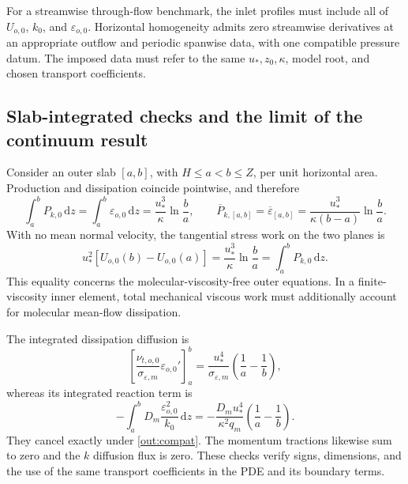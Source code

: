 \documentclass[11pt,a4paper]{article}
\numberwithin{equation}{section}
\newcommand{\eps}{\varepsilon}
\newcommand{\ust}{u_*}
\newcommand{\dd}{\mathrm d}
\begin{document}
For a streamwise through-flow benchmark, the inlet profiles must include
all of $U_{o,0}$, $k_0$, and $\eps_{o,0}$. Horizontal homogeneity admits
zero streamwise derivatives at an appropriate outflow and periodic
spanwise data, with one compatible pressure datum. The imposed data
must refer to the same $\ust,z_0,\kappa$, model root, and chosen
transport coefficients.

\subsection{Slab-integrated checks and the limit of the continuum result}
\label{out:integrals}

Consider an outer slab $[a,b]$, with $H\le a<b\le Z$, per unit
horizontal area. Production and dissipation coincide pointwise, and
therefore
\begin{equation}
 \int_a^b P_{k,0}\,\dd z
 =\int_a^b\eps_{o,0}\,\dd z
 =\frac{\ust^3}{\kappa}\ln\frac ba,
 \qquad
 \overline{P}_{k,[a,b]}=\overline\eps_{[a,b]}
 =\frac{\ust^3}{\kappa(b-a)}\ln\frac ba.
 \label{out:productionintegral}
\end{equation}
With no mean normal velocity, the tangential stress work on the two
planes is
\begin{equation}
 \ust^2[U_{o,0}(b)-U_{o,0}(a)]
 =\frac{\ust^3}{\kappa}\ln\frac ba
 =\int_a^bP_{k,0}\,\dd z.
 \label{out:outerpower}
\end{equation}
This equality concerns the molecular-viscosity-free outer equations.
In a finite-viscosity inner element, total mechanical viscous work
must additionally account for molecular mean-flow dissipation.

The integrated dissipation diffusion is
\begin{equation}
 \left[\frac{\nu_{t,o,0}}{\sigma_{\eps,m}}
           \eps_{o,0}'\right]_a^b
 =\frac{\ust^4}{\sigma_{\eps,m}}
       \left(\frac1a-\frac1b\right),
 \label{out:epsdiffintegral}
\end{equation}
whereas its integrated reaction term is
\begin{equation}
 -\int_a^bD_m\frac{\eps_{o,0}^2}{k_0}\,\dd z
 =-\frac{D_m\ust^4}{\kappa^2q_m}
       \left(\frac1a-\frac1b\right).
 \label{out:epsreactionintegral}
\end{equation}
They cancel exactly under \cref{out:compat}. The momentum tractions
likewise sum to zero and the $k$ diffusion flux is zero. These checks
verify signs, dimensions, and the use of the same transport coefficients
in the PDE and its boundary terms.
\end{document}
